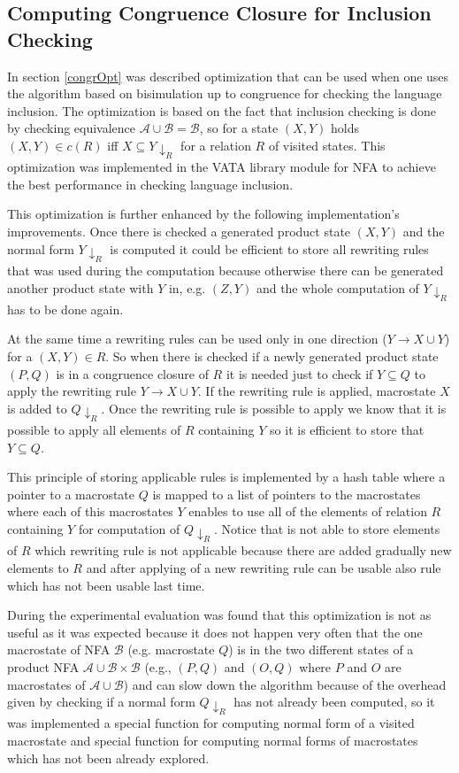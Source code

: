 \subsection{Computing Congruence Closure for Inclusion Checking}
In section \ref{congrOpt} was described optimization that can be used when one uses the algorithm based on bisimulation up to congruence for checking 
the language inclusion. The optimization is based on the fact that inclusion checking is done by checking equivalence $\mathcal{A}\cup\mathcal{B}=\mathcal{B}$,
so for a state $(X,Y)$ holds $(X,Y)\in c(R)$ iff $X\subseteq Y{\downarrow_R}$ for a relation $R$ of visited states. 
This optimization was implemented in the VATA library module for NFA to achieve the best performance in checking language inclusion.

This optimization is further enhanced by the following implementation's improvements. Once there is checked a generated product state $(X,Y)$ and the normal form 
$Y{\downarrow_R}$ is computed it could be efficient to store all rewriting rules that was used during the computation because otherwise there can be
generated another product state with $Y$ in, e.g. $(Z,Y)$ and the whole computation of $Y{\downarrow_R}$ has to be done again. 

At the same time a rewriting rules can be used only in one direction ($Y\rightarrow X\cup Y$) for a $(X,Y)\in R$. So when there is checked
if a newly generated product state $(P,Q)$ is in a congruence closure of $R$ it is needed just to check if $Y \subseteq Q$ to apply 
the rewriting rule $Y\rightarrow X\cup Y$. If the rewriting rule is applied, macrostate $X$ is added to $Q{\downarrow_R}$. 
Once the rewriting rule is possible to apply we know that it is possible to apply all elements of $R$ containing $Y$ 
so it is efficient to store that $Y\subseteq Q$.

This principle of storing applicable rules is implemented by a hash table where a pointer to a macrostate $Q$ is mapped to
a list of pointers to the macrostates where each of this macrostates $Y$ enables to use all of the elements of relation $R$ containing $Y$ 
for computation of $Q{\downarrow_R}$.
Notice that is not able to store elements of $R$ which rewriting rule is not applicable because there are added gradually
new elements to $R$ and after applying of a new rewriting rule can be usable also rule which has not been usable last time.%

During the experimental evaluation was found that this optimization is not as useful as it was expected because it does not happen very often that the one
macrostate of NFA $\mathcal{B}$ (e.g. macrostate $Q$) is in the two different states of a product NFA $\mathcal{A}\cup\mathcal{B}\times\mathcal{B}$ (e.g., $(P,Q)$
and $(O,Q)$ where $P$ and $O$ are macrostates of $\mathcal{A}\cup\mathcal{B}$) and can slow down the algorithm because of the overhead given by checking
if a normal form $Q{\downarrow_R}$ has not already been computed, so it was implemented a special function for computing normal form of a visited macrostate 
and special function for computing normal forms of macrostates which has not been already explored. 

